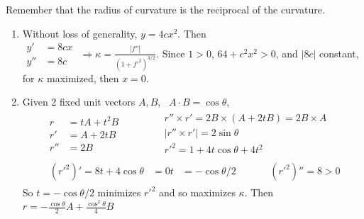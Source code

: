 \documentclass[twoside]{amsart}
\theoremstyle{plain}
\theoremstyle{definition}
\newcommand{\exercisehead}[1]
  {\smallskip
   \noindent{\small\bf Exercise #1.}}
\begin{document}
\exercisehead{10} Remember that the radius of curvature is the reciprocal of the curvature.  
\begin{enumerate}
  \item Without loss of generality, $y= 4cx^2$.  Then \\
    $\begin{aligned}
    y' & = 8cx \\
    y'' & = 8c
\end{aligned}$ \quad $\Longrightarrow \kappa = \frac{ |f''| }{  (1+f'^2)^{3/2} }$.  Since $1>0$, \quad $64 + c^2 x^2 > 0 $, and $|8c|$ constant, for $\kappa$ maximized, then $\boxed{ x=0}$.  
  \item Given 2 fixed unit vectors $A,B$, \, $A\cdot B = \cos{\theta}$, 
\[
\begin{gathered}
  \begin{aligned}
    r & = t A + t^2 B \\
    r' & = A + 2tB \\
    r'' & = 2B 
  \end{aligned} \quad \quad \quad 
  \begin{aligned}
    & r'' \times r' = 2B \times (A + 2tB) = 2B\times A \\
    & |r'' \times r'| = 2\sin{\theta} \\
    & r'^2 = 1 + 4t \cos{\theta} + 4t^2 
  \end{aligned} \\ 
  \begin{aligned}
  (r'^2)' = 8t + 4 \cos{\theta} & = 0 
    t & = -\cos{\theta}/2 
  \end{aligned} \quad \quad \quad 
  (r'^2)'' = 8 > 0 
\end{gathered}
\]
So $t = -\cos{\theta}/2$ minimizes $r'^2$ and so maximizes $\kappa$.  Then $\boxed{ r = -\frac{\cos{\theta}}{2} A + \frac{\cos^2{\theta}}{4 } B }$
\end{enumerate}
\end{document}
